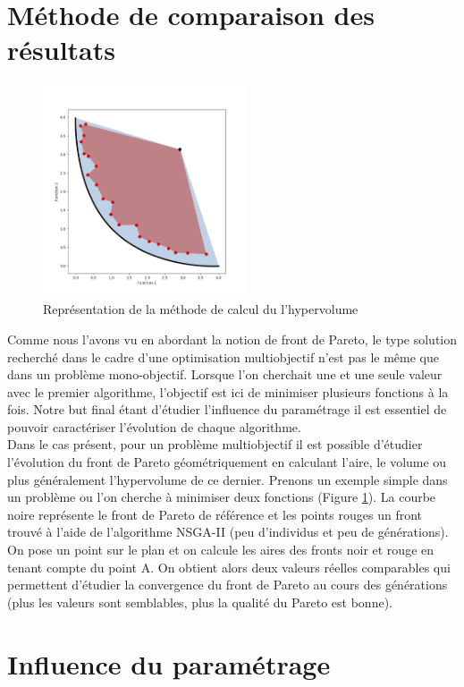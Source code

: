 \documentclass[12pt]{report}
\begin{document}
    \section{Méthode de comparaison des résultats}
      \begin{figure}
        \centering
        \includegraphics[width=6cm]{img/hypervolume.png}
        \caption{Représentation de la méthode de calcul du l'hypervolume}
        \label{hypervolume}
      \end{figure}
      Comme nous l'avons vu en abordant la notion de front de Pareto, le type solution recherché dans le cadre d'une optimisation multiobjectif n'est pas le même que dans un problème mono-objectif. Lorsque l'on cherchait une et une seule valeur avec le premier algorithme, l'objectif est ici de minimiser plusieurs fonctions à la fois. Notre but final étant d'étudier l'influence du paramétrage il est essentiel de pouvoir caractériser l'évolution de chaque algorithme. \\
      Dans le cas présent, pour un problème multiobjectif il est possible d'étudier l'évolution du front de Pareto géométriquement en calculant l'aire, le volume ou plus généralement l'hypervolume de ce dernier.
      Prenons un exemple simple dans un problème ou l'on cherche à minimiser deux fonctions (Figure \ref{hypervolume}). La courbe noire représente le front de Pareto de référence et les points rouges un front trouvé à l'aide de l'algorithme NSGA-II (peu d'individus et peu de générations). On pose un point sur le plan et on calcule les aires des fronts noir et rouge en tenant compte du point A. On obtient alors deux valeurs réelles comparables qui permettent d'étudier la convergence du front de Pareto au cours des générations (plus les valeurs sont semblables, plus la qualité du Pareto est bonne).
    \section{Influence du paramétrage}
\end{document}
